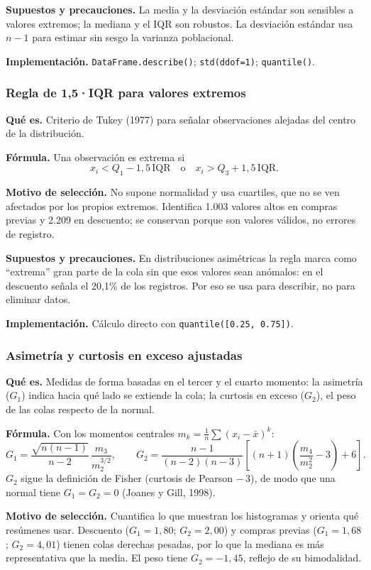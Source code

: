 \documentclass[10pt,a4paper]{article}
\begin{document}
\textbf{Supuestos y precauciones.} La media y la desviación estándar son sensibles a valores extremos; la mediana y el IQR son robustos. La desviación estándar usa $n-1$ para estimar sin sesgo la varianza poblacional.

\textbf{Implementación.} \texttt{DataFrame.describe()}; \texttt{std(ddof=1)}; \texttt{quantile()}.

\subsubsection{Regla de 1,5·IQR para valores extremos}
\textbf{Qué es.} Criterio de Tukey (1977) para señalar observaciones alejadas del centro de la distribución.

\textbf{Fórmula.} Una observación es extrema si
\[
x_i<Q_1-1{,}5\,\mathrm{IQR}\quad\text{o}\quad x_i>Q_3+1{,}5\,\mathrm{IQR}.
\]

\textbf{Motivo de selección.} No supone normalidad y usa cuartiles, que no se ven afectados por los propios extremos. Identifica 1.003 valores altos en compras previas y 2.209 en descuento; se conservan porque son valores válidos, no errores de registro.

\textbf{Supuestos y precauciones.} En distribuciones asimétricas la regla marca como ``extrema'' gran parte de la cola sin que esos valores sean anómalos: en el descuento señala el 20,1\% de los registros. Por eso se usa para describir, no para eliminar datos.

\textbf{Implementación.} Cálculo directo con \texttt{quantile([0.25, 0.75])}.

\subsubsection{Asimetría y curtosis en exceso ajustadas}
\textbf{Qué es.} Medidas de forma basadas en el tercer y el cuarto momento: la asimetría ($G_1$) indica hacia qué lado se extiende la cola; la curtosis en exceso ($G_2$), el peso de las colas respecto de la normal.

\textbf{Fórmula.} Con los momentos centrales $m_k=\frac1n\sum(x_i-\bar x)^k$:
\[
G_1=\frac{\sqrt{n(n-1)}}{n-2}\,\frac{m_3}{m_2^{3/2}},\qquad
G_2=\frac{n-1}{(n-2)(n-3)}\left[(n+1)\left(\frac{m_4}{m_2^{2}}-3\right)+6\right].
\]
$G_2$ sigue la definición de Fisher (curtosis de Pearson $-\,3$), de modo que una normal tiene $G_1=G_2=0$ (Joanes y Gill, 1998).

\textbf{Motivo de selección.} Cuantifica lo que muestran los histogramas y orienta qué resúmenes usar. Descuento ($G_1=1{,}80$; $G_2=2{,}00$) y compras previas ($G_1=1{,}68$; $G_2=4{,}01$) tienen colas derechas pesadas, por lo que la mediana es más representativa que la media. El peso tiene $G_2=-1{,}45$, reflejo de su bimodalidad.
\end{document}
